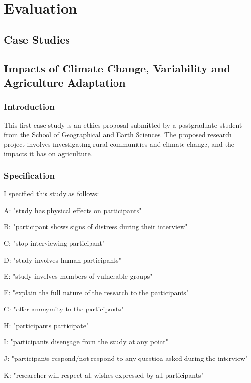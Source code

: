 \documentclass{l4proj}
\begin{document}
\chapter{Evaluation}


\section{Case Studies}

\section{Impacts of Climate Change, Variability and Agriculture Adaptation}

\subsection{Introduction}

This first case study is an ethics proposal submitted by a postgraduate student from the School of Geographical and Earth Sciences. The proposed research project involves investigating rural communities and climate change, and the impacts it has on agriculture. 

\subsection{Specification}

I specified this study as follows: 

A: "study has physical effects on participants"

B: "participant shows signs of distress during their interview"

C: "stop interviewing participant"

D: "study involves human participants"

E: "study involves members of vulnerable groups"

F: "explain the full nature of the research to the participants"

G: "offer anonymity to the participants"

H: "participants participate"

I: "participants disengage from the study at any point"

J: "participants respond/not respond to any question asked during the interview"

K: "researcher will respect all wishes expressed by all participants"
\end{document}
